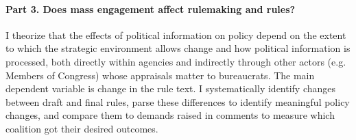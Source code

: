\paragraph{Part 3. Does mass engagement affect rulemaking and rules?} 
I theorize that the effects of political information on policy depend on the extent to which the strategic environment allows change and how political information is processed, both directly within agencies and indirectly through other actors (e.g. Members of Congress) whose appraisals matter to bureaucrats.
The main dependent variable is change in the rule text.
I systematically identify changes between draft and final rules, parse these differences to identify meaningful policy changes, and compare them to demands raised in comments to measure which coalition got their desired outcomes.%